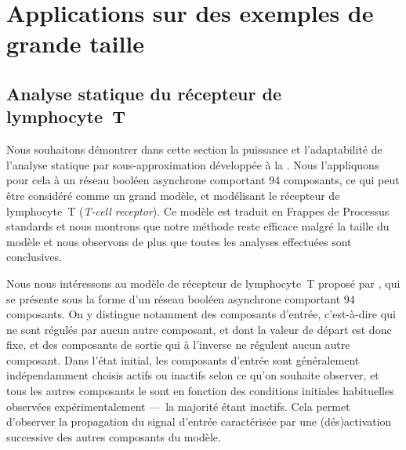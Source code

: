 
\chapter{Applications sur des exemples de grande taille}







\section{Analyse statique du récepteur de lymphocyte~T}

Nous souhaitons démontrer dans cette section la puissance et l'adaptabilité
de l'analyse statique par sous-approximation développée à la .
Nous l'appliquons pour cela à un réseau booléen asynchrone
comportant 94 composants, ce qui peut être considéré comme un grand modèle,
et modélisant le récepteur de lymphocyte~T (\textit{T-cell receptor}).
Ce modèle est traduit en Frappes de Processus standards
et nous montrons que notre méthode reste efficace malgré la taille du modèle
et nous observons de plus que toutes les analyses effectuées sont conclusives.

\myskip

Nous nous intéressons au modèle de récepteur de lymphocyte~T
proposé par ,
qui se présente sous la forme d'un réseau booléen asynchrone comportant 94 composants.
On y distingue notamment des composants d'entrée, c'est-à-dire qui ne sont régulés
par aucun autre composant, et dont la valeur de départ est donc fixe,
et des composants de sortie qui à l'inverse ne régulent aucun autre composant.
Dans l'état initial, les composants d'entrée sont généralement
indépendamment choisis actifs ou inactifs selon ce qu'on souhaite observer,
et tous les autres composants le sont en fonction des conditions initiales habituelles
observées expérimentalement ---~la majorité étant inactifs.
Cela permet d'observer la propagation du signal d'entrée caractérisée par une (dés)activation
successive des autres composants du modèle.

